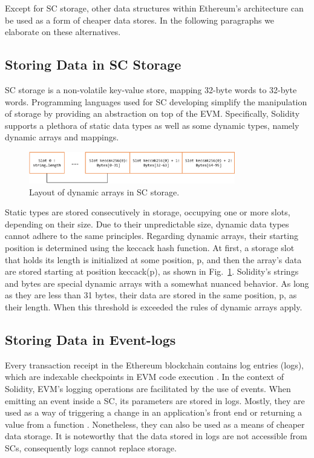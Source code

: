 Except for SC storage, other data structures within Ethereum’s architecture can be used as a form of cheaper data stores. In the following paragraphs we elaborate on these alternatives.

\subsection{Storing Data in SC Storage}\label{subsection:}
SC storage is a non-volatile key-value store, mapping 32-byte words to 32-byte words. Programming languages used for SC developing simplify the manipulation of storage by providing an abstraction on top of the EVM. Specifically, Solidity supports a plethora of static data types as well as some dynamic types, namely dynamic arrays and mappings.

\begin{figure}[htbp]
\centerline{\includegraphics[width=9cm]{figs/Storage.pdf}}
\caption{Layout of dynamic arrays in SC storage.}
\label{fig:arrays}
\end{figure}

Static types are stored consecutively in storage, occupying one or more slots, depending on their size. Due to their unpredictable size, dynamic data types cannot adhere to the same principles. Regarding dynamic arrays, their starting position is determined using the keccack hash function. At first, a storage slot that holds its length is initialized at some position, p, and then the array’s data are stored starting at position keccack(p), as shown in Fig.~\ref{fig:arrays}. Solidity’s strings and bytes are special dynamic arrays with a somewhat nuanced behavior. As long as they are less than 31 bytes, their data are stored in the same position, p, as their length. When this threshold is exceeded the rules of dynamic arrays apply.

\subsection{Storing Data in Event-logs}\label{subsection:}
Every transaction receipt in the Ethereum blockchain contains log entries (logs), which are indexable checkpoints in EVM code execution  \citep{wood_2014}. In the context of Solidity, EVM’s logging operations are facilitated by the use of events. When emitting an event inside a SC, its parameters are stored in logs. Mostly, they are used as a way of triggering a change in an application’s front end or returning a value from a function  \citep{consensys}. Nonetheless, they can also be used as a means of cheaper data storage. It is noteworthy that the data stored in logs are not accessible from SCs, consequently logs cannot replace storage.

